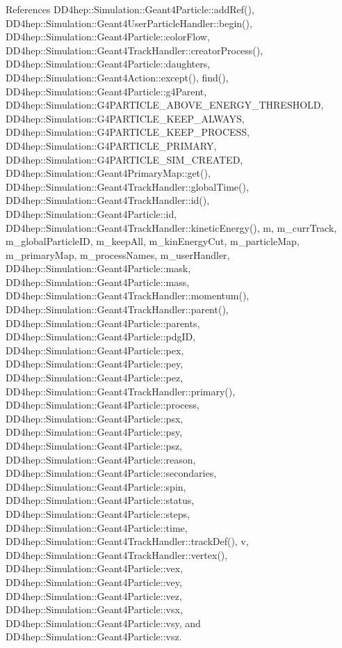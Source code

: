 References D\+D4hep\+::\+Simulation\+::\+Geant4\+Particle\+::add\+Ref(), D\+D4hep\+::\+Simulation\+::\+Geant4\+User\+Particle\+Handler\+::begin(), D\+D4hep\+::\+Simulation\+::\+Geant4\+Particle\+::color\+Flow, D\+D4hep\+::\+Simulation\+::\+Geant4\+Track\+Handler\+::creator\+Process(), D\+D4hep\+::\+Simulation\+::\+Geant4\+Particle\+::daughters, D\+D4hep\+::\+Simulation\+::\+Geant4\+Action\+::except(), find(), D\+D4hep\+::\+Simulation\+::\+Geant4\+Particle\+::g4\+Parent, D\+D4hep\+::\+Simulation\+::\+G4\+P\+A\+R\+T\+I\+C\+L\+E\+\_\+\+A\+B\+O\+V\+E\+\_\+\+E\+N\+E\+R\+G\+Y\+\_\+\+T\+H\+R\+E\+S\+H\+O\+LD, D\+D4hep\+::\+Simulation\+::\+G4\+P\+A\+R\+T\+I\+C\+L\+E\+\_\+\+K\+E\+E\+P\+\_\+\+A\+L\+W\+A\+YS, D\+D4hep\+::\+Simulation\+::\+G4\+P\+A\+R\+T\+I\+C\+L\+E\+\_\+\+K\+E\+E\+P\+\_\+\+P\+R\+O\+C\+E\+SS, D\+D4hep\+::\+Simulation\+::\+G4\+P\+A\+R\+T\+I\+C\+L\+E\+\_\+\+P\+R\+I\+M\+A\+RY, D\+D4hep\+::\+Simulation\+::\+G4\+P\+A\+R\+T\+I\+C\+L\+E\+\_\+\+S\+I\+M\+\_\+\+C\+R\+E\+A\+T\+ED, D\+D4hep\+::\+Simulation\+::\+Geant4\+Primary\+Map\+::get(), D\+D4hep\+::\+Simulation\+::\+Geant4\+Track\+Handler\+::global\+Time(), D\+D4hep\+::\+Simulation\+::\+Geant4\+Track\+Handler\+::id(), D\+D4hep\+::\+Simulation\+::\+Geant4\+Particle\+::id, D\+D4hep\+::\+Simulation\+::\+Geant4\+Track\+Handler\+::kinetic\+Energy(), m, m\+\_\+curr\+Track, m\+\_\+global\+Particle\+ID, m\+\_\+keep\+All, m\+\_\+kin\+Energy\+Cut, m\+\_\+particle\+Map, m\+\_\+primary\+Map, m\+\_\+process\+Names, m\+\_\+user\+Handler, D\+D4hep\+::\+Simulation\+::\+Geant4\+Particle\+::mask, D\+D4hep\+::\+Simulation\+::\+Geant4\+Particle\+::mass, D\+D4hep\+::\+Simulation\+::\+Geant4\+Track\+Handler\+::momentum(), D\+D4hep\+::\+Simulation\+::\+Geant4\+Track\+Handler\+::parent(), D\+D4hep\+::\+Simulation\+::\+Geant4\+Particle\+::parents, D\+D4hep\+::\+Simulation\+::\+Geant4\+Particle\+::pdg\+ID, D\+D4hep\+::\+Simulation\+::\+Geant4\+Particle\+::pex, D\+D4hep\+::\+Simulation\+::\+Geant4\+Particle\+::pey, D\+D4hep\+::\+Simulation\+::\+Geant4\+Particle\+::pez, D\+D4hep\+::\+Simulation\+::\+Geant4\+Track\+Handler\+::primary(), D\+D4hep\+::\+Simulation\+::\+Geant4\+Particle\+::process, D\+D4hep\+::\+Simulation\+::\+Geant4\+Particle\+::psx, D\+D4hep\+::\+Simulation\+::\+Geant4\+Particle\+::psy, D\+D4hep\+::\+Simulation\+::\+Geant4\+Particle\+::psz, D\+D4hep\+::\+Simulation\+::\+Geant4\+Particle\+::reason, D\+D4hep\+::\+Simulation\+::\+Geant4\+Particle\+::secondaries, D\+D4hep\+::\+Simulation\+::\+Geant4\+Particle\+::spin, D\+D4hep\+::\+Simulation\+::\+Geant4\+Particle\+::status, D\+D4hep\+::\+Simulation\+::\+Geant4\+Particle\+::steps, D\+D4hep\+::\+Simulation\+::\+Geant4\+Particle\+::time, D\+D4hep\+::\+Simulation\+::\+Geant4\+Track\+Handler\+::track\+Def(), v, D\+D4hep\+::\+Simulation\+::\+Geant4\+Track\+Handler\+::vertex(), D\+D4hep\+::\+Simulation\+::\+Geant4\+Particle\+::vex, D\+D4hep\+::\+Simulation\+::\+Geant4\+Particle\+::vey, D\+D4hep\+::\+Simulation\+::\+Geant4\+Particle\+::vez, D\+D4hep\+::\+Simulation\+::\+Geant4\+Particle\+::vsx, D\+D4hep\+::\+Simulation\+::\+Geant4\+Particle\+::vsy, and D\+D4hep\+::\+Simulation\+::\+Geant4\+Particle\+::vsz.



